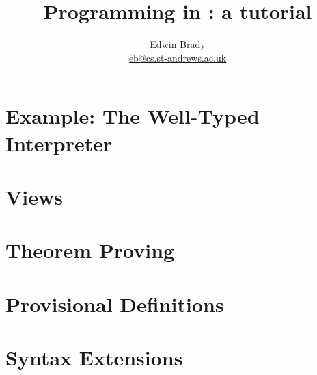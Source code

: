 \documentclass{article}
\title{Programming in \Idris{}: a tutorial}
\author{Edwin Brady \\ \url{eb@cs.st-andrews.ac.uk}}
\begin{document}
\maketitle








\section{Example: The Well-Typed Interpreter}
\section{Views}
\section{Theorem Proving}
\section{Provisional Definitions}
\section{Syntax Extensions}





\end{document}
